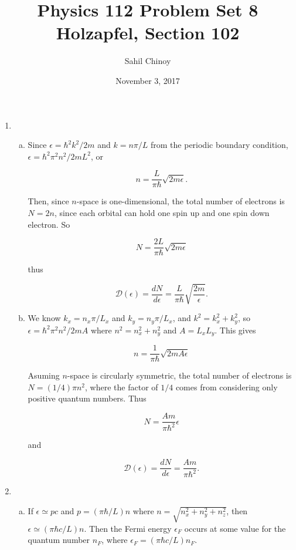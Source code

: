 \documentclass{article}
\title{Physics 112 Problem Set 8 \\ \large{Holzapfel, Section 102}}
\author{Sahil Chinoy}
\date{November 3, 2017}
\begin{document}
\maketitle{}

\begin{enumerate}

	\item

	\begin{enumerate}[(a)]

		\item

		Since $\epsilon = \hbar^2 k^2 /2m$ and $k = n\pi/L$ from the periodic boundary condition, $\epsilon = \hbar^2 \pi^2 n^2 / 2mL^2$, or

		$$n = \frac{L}{\pi \hbar} \sqrt{2m\epsilon}.$$

		Then, since $n$-space is one-dimensional, the total number of electrons is $N = 2n$, since each orbital can hold one spin up and one spin down electron. So

		$$N = \frac{2L}{\pi \hbar} \sqrt{2m\epsilon}$$

		thus

		$$\mathcal{D}(\epsilon) = \frac{dN}{d\epsilon} = \frac{L}{\pi\hbar} \sqrt{\frac{2m}{\epsilon}}.$$

		\item

		We know $k_x = n_x \pi /L_x$ and $k_y = n_y \pi / L_x$, and $k^2 = k_x^2 + k_y^2$, so $\epsilon = \hbar^2 \pi^2 n^2 / 2mA$ where $n^2 = n_x^2 + n_y^2$ and $A = L_x L_y$. This gives

		$$n = \frac{1}{\pi \hbar} \sqrt{2m A \epsilon}$$

		Asuming $n$-space is circularly symmetric, the total number of electrons is $N = (1/4) \pi n^2$, where the factor of $1/4$ comes from considering only positive quantum numbers. Thus

		$$N = \frac{Am}{\pi\hbar^2} \epsilon$$

		and

		$$\mathcal{D}(\epsilon) = \frac{dN}{d\epsilon} = \frac{Am}{\pi \hbar^2}.$$

	\end{enumerate}

	\item

	\begin{enumerate}[(a)]

		\item

		If $\epsilon \simeq pc$ and $p = (\pi \hbar / L) n$ where $n = \sqrt{n_x^2 + n_y^2 + n_z^2}$, then $\epsilon \simeq (\pi \hbar c / L) n$. Then the Fermi energy $\epsilon_F$ occurs at some value for the quantum number $n_F$, where $\epsilon_F = (\pi \hbar c / L) n_F$.


\end{enumerate}
\end{enumerate}
\end{document}
